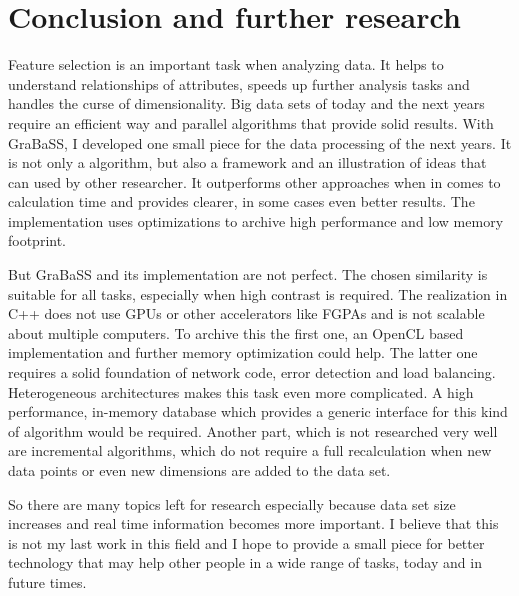 \chapter{Conclusion and further research}
Feature selection is an important task when analyzing data. It helps to understand relationships of attributes, speeds up further analysis tasks and handles the curse of dimensionality. Big data sets of today and the next years require an efficient way and parallel algorithms that provide solid results. With GraBaSS, I developed one small piece for the data processing of the next years. It is not only a algorithm, but also a framework and an illustration of ideas that can used by other researcher. It outperforms other approaches when in comes to calculation time and provides clearer, in some cases even better results. The implementation uses optimizations to archive high performance and low memory footprint.

But GraBaSS and its implementation are not perfect. The chosen similarity is suitable for all tasks, especially when high contrast is required. The realization in C++ does not use GPUs or other accelerators like FGPAs and is not scalable about multiple computers. To archive this the first one, an OpenCL based implementation and further memory optimization could help. The latter one requires a solid foundation of network code, error detection and load balancing. Heterogeneous architectures makes this task even more complicated. A high performance, in-memory database which provides a generic interface for this kind of algorithm would be required. Another part, which is not researched very well are incremental algorithms, which do not require a full recalculation when new data points or even new dimensions are added to the data set.

So there are many topics left for research especially because data set size increases and real time information becomes more important. I believe that this is not my last work in this field and I hope to provide a small piece for better technology that may help other people in a wide range of tasks, today and in future times. 
